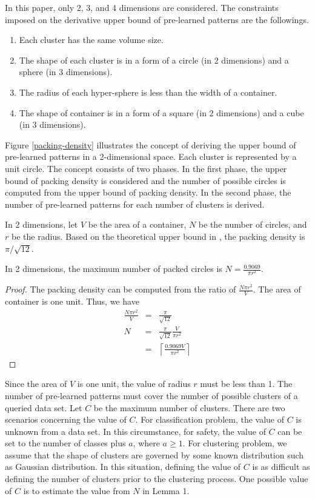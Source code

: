 \documentclass[lettersize,journal]{IEEEtran}
\begin{document}
In this paper, only 2, 3, and 4 dimensions are considered. The constraints imposed on the derivative 
upper bound of pre-learned patterns are the followings.
\begin{enumerate}
\item Each cluster has the same volume size.
\item The shape of each cluster is in a form of a circle (in 2 dimensions) and a sphere (in 3 dimensions).
\item The radius of each hyper-sphere is less than the width of a container.
\item The shape of container is in a form of a square (in 2 dimensions) and a cube (in 3 dimensions).
\end{enumerate}
Figure \ref{packing-density} illustrates the concept of deriving the upper bound of pre-learned patterns 
in a 2-dimensional space. Each cluster is represented by a unit circle.  
The concept consists of two phases. In the first phase, the upper bound of packing density is considered 
and the number of possible circles is computed from the upper bound of packing density. In the second 
phase, the number of pre-learned patterns for each number of clusters is derived. 

In 2 dimensions, let $V$ be the area of a container, $N$ be the number of circles, and $r$ be the radius.
Based on the theoretical upper bound in \cite{Gaber}, the packing density is $\pi/\sqrt{12}$.

\begin{lemma}
In 2 dimensions, the maximum number of packed circles is $N = \frac{0.9069}{\pi r^{2}}$.
\end{lemma} 
\begin{proof}
The packing density can be computed from the ratio of $\frac{N \pi r^{2}}{V}$. The area of container is one
unit. Thus, we have
\begin{eqnarray}
\frac{N \pi r^{2}}{V} & = & \frac{\pi}{\sqrt{12}} \\
N & = & \frac{\pi}{\sqrt{12}} \frac{V}{\pi r^{2}} \\
 & = & \left \lceil \frac{0.9069V}{\pi r^{2}} \right \rceil
\end{eqnarray}
\end{proof}
Since the area of $V$ is one unit, the value of radius $r$ must be less than 1. The number of pre-learned 
patterns must cover the number of possible clusters of a queried data set. Let $C$ be the maximum number 
of clusters. There are two scenarios concerning the value of $C$. For classification problem, the value 
of $C$ is unknown from a data set. In this circumstance, for safety, the value of $C$ can be set to the 
number of classes plus $a$, where $a \geq 1$. For clustering problem, we assume that the shape of clusters 
are governed by some known distribution such as Gaussian distribution. In this situation, defining the 
value of $C$ is as difficult as defining the number of clusters prior to the clustering process. One 
possible value of $C$ is to estimate the value from $N$ in Lemma 1.
\end{document}
